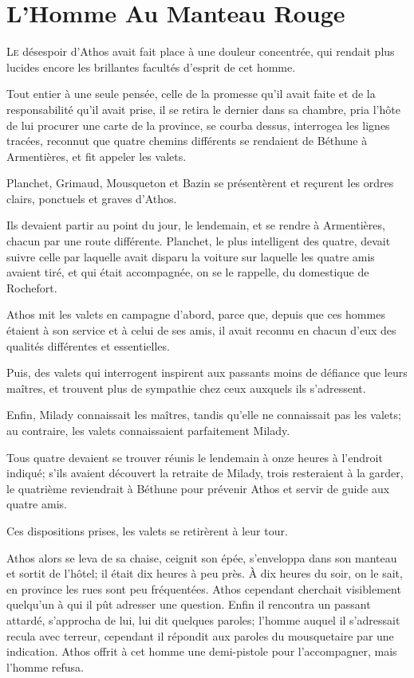 
\chapter{L'Homme Au Manteau Rouge}

\lettrine{L}{e} désespoir d'Athos avait fait place à une douleur concentrée, qui rendait plus lucides encore les brillantes facultés d'esprit de cet homme. 

\zz
Tout entier à une seule pensée, celle de la promesse qu'il avait faite et de la responsabilité qu'il avait prise, il se retira le dernier dans sa chambre, pria l'hôte de lui procurer une carte de la province, se courba dessus, interrogea les lignes tracées, reconnut que quatre chemins différents se rendaient de Béthune à Armentières, et fit appeler les valets. 

Planchet, Grimaud, Mousqueton et Bazin se présentèrent et reçurent les ordres clairs, ponctuels et graves d'Athos. 

Ils devaient partir au point du jour, le lendemain, et se rendre à Armentières, chacun par une route différente. Planchet, le plus intelligent des quatre, devait suivre celle par laquelle avait disparu la voiture sur laquelle les quatre amis avaient tiré, et qui était accompagnée, on se le rappelle, du domestique de Rochefort. 

Athos mit les valets en campagne d'abord, parce que, depuis que ces hommes étaient à son service et à celui de ses amis, il avait reconnu en chacun d'eux des qualités différentes et essentielles. 

Puis, des valets qui interrogent inspirent aux passants moins de défiance que leurs maîtres, et trouvent plus de sympathie chez ceux auxquels ils s'adressent. 

Enfin, Milady connaissait les maîtres, tandis qu'elle ne connaissait pas les valets; au contraire, les valets connaissaient parfaitement Milady. 

Tous quatre devaient se trouver réunis le lendemain à onze heures à l'endroit indiqué; s'ils avaient découvert la retraite de Milady, trois resteraient à la garder, le quatrième reviendrait à Béthune pour prévenir Athos et servir de guide aux quatre amis. 

Ces dispositions prises, les valets se retirèrent à leur tour. 

Athos alors se leva de sa chaise, ceignit son épée, s'enveloppa dans son manteau et sortit de l'hôtel; il était dix heures à peu près. À dix heures du soir, on le sait, en province les rues sont peu fréquentées. Athos cependant cherchait visiblement quelqu'un à qui il pût adresser une question. Enfin il rencontra un passant attardé, s'approcha de lui, lui dit quelques paroles; l'homme auquel il s'adressait recula avec terreur, cependant il répondit aux paroles du mousquetaire par une indication. Athos offrit à cet homme une demi-pistole pour l'accompagner, mais l'homme refusa. 

